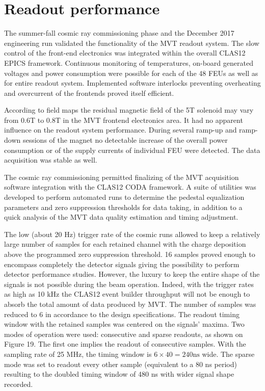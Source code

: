 \section{Readout performance}

The summer-fall cosmic ray commissioning phase and the December 2017 engineering run validated the functionality of the 
MVT readout system. The slow control of the front-end electronics was integrated within the overall CLAS12 EPICS 
framework. Continuous monitoring of temperatures, on-board generated voltages and power consumption were possible for 
each of the 48 FEUs as well as for entire readout system. Implemented software interlocks preventing overheating and 
overcurrent of the frontends proved itself efficient.

According to field maps the residual magnetic field of the 5T solenoid may vary from 0.6T to 0.8T in the MVT frontend 
electronics area. It had no apparent influence on the readout system performance. During several ramp-up and ramp-down 
sessions of the magnet no detectable increase of the overall power consumption or of the supply currents of individual 
FEU were detected. The data acquisition was stable as well.

The cosmic ray commissioning permitted finalizing of the MVT acquisition software integration with the CLAS12 CODA 
framework. A suite of utilities was developed to perform automated runs to determine the pedestal equalization 
parameters and zero suppression thresholds for data taking, in addition to a quick analysis of the MVT data quality 
estimation and timing adjustment.

The low (about 20 Hz) trigger rate of the cosmic runs allowed to keep a relatively large number of samples for each 
retained channel with the charge deposition above the programmed zero suppression threshold. 16 samples proved enough 
to encompass completely the detector signals giving the possibility to perform detector performance studies. However, 
the luxury to keep the entire shape of the signals is not possible during the beam operation. Indeed, with the trigger 
rates as high as 10 kHz the CLAS12 event builder throughput will not be enough to absorb the total amount of data 
produced by MVT. The number of samples was reduced to 6 in accordance to the design specifications. The readout timing 
window with the retained samples was centered on the signals' maxima. Two modes of operation were used: consecutive and 
sparse readouts, as shown on Figure 19. The first one implies the readout of consecutive samples. With the sampling rate 
of 25 MHz, the timing window is $6 \times 40 = 240 \text{ns}$ wide. The sparse mode was set to readout every other 
sample (equivalent to a 80 ns period) resulting to the doubled timing window of 480 ns with wider signal shape recorded.


